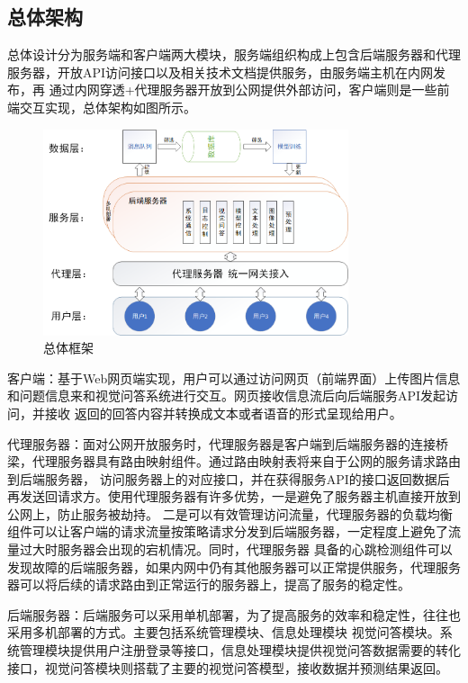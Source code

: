 \subsection{总体架构}
总体设计分为服务端和客户端两大模块，服务端组织构成上包含后端服务器和代理服务器，开放API访问接口以及相关技术文档提供服务，由服务端主机在内网发布，再
通过内网穿透+代理服务器开放到公网提供外部访问，客户端则是一些前端交互实现，总体架构如图所示。
\begin{figure}[htbp]
	\centering	
	\includegraphics[width=0.8\textwidth]{Fig/myfig/chapter5/sys_framwork.png}  %
	\caption{\label{sys_framwork}总体框架} 
\end{figure}
客户端：基于Web网页端实现，用户可以通过访问网页（前端界面）上传图片信息和问题信息来和视觉问答系统进行交互。网页接收信息流后向后端服务API发起访问，并接收
返回的回答内容并转换成文本或者语音的形式呈现给用户。

代理服务器：面对公网开放服务时，代理服务器是客户端到后端服务器的连接桥梁，代理服务器具有路由映射组件。通过路由映射表将来自于公网的服务请求路由到后端服务器，
访问服务器上的对应接口，并在获得服务API的接口返回数据后再发送回请求方。使用代理服务器有许多优势，一是避免了服务器主机直接开放到公网上，防止服务被劫持。
二是可以有效管理访问流量，代理服务器的负载均衡组件可以让客户端的请求流量按策略请求分发到后端服务器，一定程度上避免了流量过大时服务器会出现的宕机情况。同时，代理服务器
具备的心跳检测组件可以发现故障的后端服务器，如果内网中仍有其他服务器可以正常提供服务，代理服务器可以将后续的请求路由到正常运行的服务器上，提高了服务的稳定性。

后端服务器：后端服务可以采用单机部署，为了提高服务的效率和稳定性，往往也采用多机部署的方式。主要包括系统管理模块、信息处理模块
视觉问答模块。系统管理模块提供用户注册登录等接口，信息处理模块提供视觉问答数据需要的转化接口，视觉问答模块则搭载了主要的视觉问答模型，接收数据并预测结果返回。

